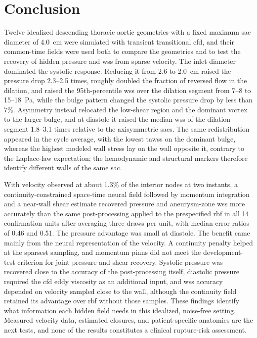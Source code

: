 \documentclass[12pt,a4paper]{article}
\newcommand{\CFD}{\ac{cfd}\xspace}
\newcommand{\PINNs}{\acp{pinn}\xspace}
\newcommand{\WSS}{\ac{wss}\xspace}
\newcommand{\TAWSS}{\ac{tawss}\xspace}
\newcommand{\RBF}{\ac{rbf}\xspace}
\theoremstyle{definition}
\numberwithin{equation}{section}
\begin{document}
\section{Conclusion}
\label{sec:conclusion}
Twelve idealized descending thoracic aortic geometries with a fixed maximum sac diameter of 4.0~cm were simulated with transient transitional \CFD, and their common-time fields were used both to compare the geometries and to test the recovery of hidden pressure and \WSS from sparse velocity. The inlet diameter dominated the systolic response. Reducing it from 2.6 to 2.0~cm raised the pressure drop 2.3--2.5 times, roughly doubled the fraction of reversed flow in the dilation, and raised the 95th-percentile \WSS over the dilation segment from 7--8 to 15--18~Pa, while the bulge pattern changed the systolic pressure drop by less than 7\%. Asymmetry instead relocated the low-shear region and the dominant vortex to the larger bulge, and at diastole it raised the median \WSS of the dilation segment 1.8--3.1 times relative to the axisymmetric sacs. The same redistribution appeared in the cycle average, with the lowest \TAWSS on the dominant bulge, whereas the highest modeled wall stress lay on the wall opposite it, contrary to the Laplace-law expectation; the hemodynamic and structural markers therefore identify different walls of the same sac.

With velocity observed at about 1.3\% of the interior nodes at two instants, a continuity-constrained space-time neural field followed by momentum integration and a near-wall shear estimate recovered pressure and aneurysm-zone \WSS more accurately than the same post-processing applied to the prespecified \RBF in all 14 confirmation units after averaging three draws per unit, with median error ratios of 0.46 and 0.51. The pressure advantage was small at diastole. The benefit came mainly from the neural representation of the velocity. A continuity penalty helped at the sparsest sampling, and momentum \PINNs did not meet the development-test criterion for joint pressure and shear recovery. Systolic pressure was recovered close to the accuracy of the post-processing itself, diastolic pressure required the \CFD eddy viscosity as an additional input, and \WSS accuracy depended on velocity sampled close to the wall, although the continuity field retained its advantage over \RBF without those samples. These findings identify what information each hidden field needs in this idealized, noise-free setting. Measured velocity data, estimated closures, and patient-specific anatomies are the next tests, and none of the results constitutes a clinical rupture-risk assessment.
\end{document}
